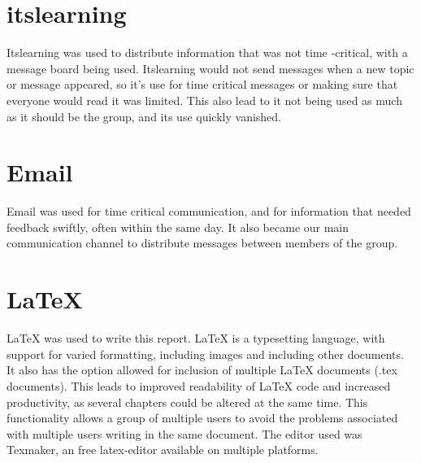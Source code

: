 \section{itslearning}
Itslearning was used to distribute information that was not time -critical, with a message board being used. Itslearning would not send messages when a new topic or message appeared, so it's use for time critical messages or making sure that everyone would read it was limited. This also lead to it not being used as much as it should be the group, and its use quickly vanished.

\section{Email}
Email was used for time critical communication, and for information that needed feedback swiftly, often within the same day. It also became our main communication channel to distribute messages between members of the group.

\section{LaTeX}
\label{def:latex}
LaTeX was used to write this report. LaTeX is a typesetting language, with support for varied formatting, including images and including other documents. It also has the option allowed for inclusion of multiple LaTeX documents (.tex documents). This leads to improved readability of LaTeX code and increased productivity, as several chapters could be altered at the same time. This functionality allows a group of multiple users to avoid the problems associated with multiple users writing in the same document. The editor used was Texmaker, an free latex-editor available on multiple platforms.
